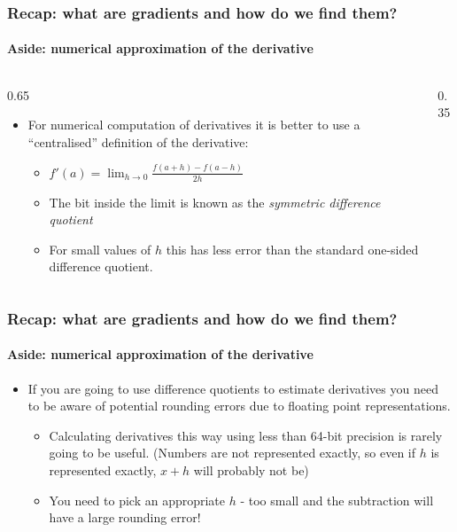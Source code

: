 \documentclass[]{article}
\begin{document}
\begin{frame}
\frametitle{Recap: what are gradients and how do we find them?}
\framesubtitle{Aside: numerical approximation of the derivative}

\begin{columns}
\begin{column}{0.65\textwidth}
\begin{itemize}
\item For numerical computation of derivatives it is better to use a ``centralised'' definition of the derivative:
\begin{itemize}
	\item<+-> $f'(a) = \lim_{h\to0} \frac{f(a+h) - f(a-h)}{2h}$
	\item<+-> The bit inside the limit is known as the \emph{symmetric difference quotient}
	\item<+-> For small values of $h$ this has less error than the standard one-sided difference quotient.
\end{itemize}
\end{itemize}

\end{column}
\begin{column}{0.35\textwidth}


\end{column}
\end{columns}
\end{frame}


\begin{frame}
\frametitle{Recap: what are gradients and how do we find them?}
\framesubtitle{Aside: numerical approximation of the derivative}
\begin{itemize}
\item<+-> If you are going to use difference quotients to estimate derivatives you need to be aware of potential rounding errors due to floating point representations.
\begin{itemize}
	\item Calculating derivatives this way using less than 64-bit precision is rarely going to be useful. (Numbers are not represented exactly, so even if $h$ is represented exactly, $x+h$ will probably not be)
	\item You need to pick an appropriate $h$ - too small and the subtraction will have a large rounding error!
\end{itemize}
\end{itemize}
\end{frame}
\end{document}
